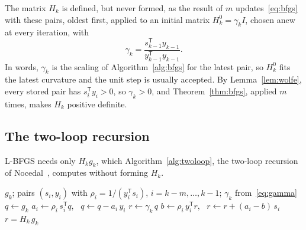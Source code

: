 \documentclass[11pt,a4paper]{amsart}
\numberwithin{equation}{section}
\theoremstyle{plain}
\theoremstyle{definition}
\theoremstyle{remark}
\newcommand{\T}{\mathsf{T}}
\begin{document}
The matrix $H_k$ is defined, but never formed, as the result of $m$
updates~\eqref{eq:bfgs} with these pairs, oldest first, applied to an
initial matrix $H_k^0 = \gamma_k I$, chosen anew at every iteration,
with~\cite[\S7.2]{nocedal2006}
\begin{equation}\label{eq:gamma}
  \gamma_k = \frac{s_{k-1}^\T y_{k-1}}{y_{k-1}^\T y_{k-1}} .
\end{equation}
In words, $\gamma_k$ is the scaling of Algorithm~\ref{alg:bfgs} for the
latest pair, so $H_k^0$ fits the latest curvature and the unit step is
usually accepted. By Lemma~\ref{lem:wolfe}, every stored pair has
$s_i^\T y_i > 0$, so $\gamma_k > 0$, and Theorem~\ref{thm:bfgs}, applied
$m$ times, makes $H_k$ positive definite.

\subsection{The two-loop recursion}\label{sec:twoloop}

L-BFGS needs only $H_k g_k$, which Algorithm~\ref{alg:twoloop}, the
two-loop recursion of Nocedal~\cite{nocedal1980}, computes without
forming $H_k$.

\begin{algorithm}[tbp]
\caption{The two-loop recursion~\cite[Algorithm~7.4]{nocedal2006}}
\label{alg:twoloop}
\small
\begin{algorithmic}[1]
\Require $g_k$; pairs $(s_i, y_i)$ with $\rho_i = 1/(y_i^\T s_i)$,
  $i = k-m, \dots, k-1$; $\gamma_k$ from~\eqref{eq:gamma}
\State $q \gets g_k$
 
  \State $a_i \gets \rho_i\, s_i^\T q$, \ $q \gets q - a_i\, y_i$
\EndFor
\State $r \gets \gamma_k\, q$ 
 
  \State $b \gets \rho_i\, y_i^\T r$, \ $r \gets r + (a_i - b)\, s_i$
\EndFor
\State \Return $r = H_k\, g_k$
\end{algorithmic}
\end{algorithm}
\end{document}
